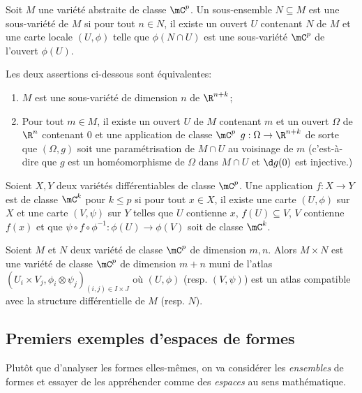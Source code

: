 \begin{definition}
	Soit $M$ une variété abstraite de classe $\mC^{p}$.
	Un sous-ensemble $N \subseteq M$ est une sous-variété de $M$ si pour tout $n \in N$, il existe un ouvert
	$U$ contenant $N$ de $M$ et une carte locale $(U, \phi)$ telle que $\phi(N \cap U)$ est une sous-variété
	$\mC^{p}$ de l'ouvert $\phi(U)$.
\end{definition}

\begin{proposition}
	Les deux assertions ci-dessous sont équivalentes:
	\begin{enumerate}
		\item $M$ est une sous-variété de dimension $n$ de $\R^{n + k}$;
		\item Pour tout $m \in M$, il existe un ouvert $U$ de $M$ contenant $m$ et un ouvert $\Omega$ de
		      $\R^{n}$ contenant $0$ et une application de classe $\mC^{p}$ $g: \Omega \to \R^{n + k}$ de
		      sorte que $(\Omega, g)$ soit une paramétrisation de $M \cap U$ au voisinage de $m$ (c'est-à-dire
		      que $g$ est un homéomorphisme de $\Omega$ dans $M \cap U$ et $\d g(0)$ est injective.)
	\end{enumerate}
\end{proposition}

\begin{definition}
	Soient $X, Y$ deux variétés différentiables de classe $\mC^{p}$.
	Une application $f: X \to Y$ est de classe $\mC^{k}$ pour $k \leq p$ si pour tout $x \in X$, il existe
	une carte $(U, \phi)$ sur $X$ et une carte $(V, \psi)$ sur $Y$ telles que $U$ contienne $x$,
	$f(U) \subseteq V$, $V$ contienne $f(x)$ et que $\psi \circ f \circ \phi^{-1}: \phi(U) \to \phi(V)$ soit
	de classe $\mC^{k}$.
\end{definition}

\begin{definition}
	Soient $M$ et $N$ deux variété de classe $\mC^{p}$ de dimension $m, n$.
	Alors $M \times N$ est une variété de classe $\mC^{p}$ de dimension $m + n$
	muni de l'atlas	$(U_{i} \times V_{j}, \phi_{i} \otimes \psi_{j})_{(i, j) \in I \times J}$
	où $(U, \phi)$ (resp. $(V, \psi)$) est un atlas compatible avec la structure différentielle de $M$
	(resp. $N$).
\end{definition}

\subsection{Premiers exemples d'espaces de formes}
Plutôt que d'analyser les formes elles-mêmes, on va considérer les \textit{ensembles} de formes et
essayer de les appréhender comme des \textit{espaces} au sens mathématique.

